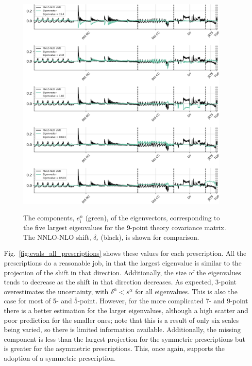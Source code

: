 \begin{figure}[H]
  \begin{center}
    \includegraphics[width=0.95\textwidth]{mhous/plots/eigenvector_plot_10.pdf}\\
    \caption{\small The components,  $e^\alpha_i$ (green), of the eigenvectors, corresponding
      to the five largest eigenvalues for the 9-point theory covariance matrix. The NNLO-NLO shift, $\delta_i$ (black), is shown for comparison.
    \label{fig:evecs1} }
  \end{center}
\end{figure}
Fig.~\ref{fig:evals_all_prescriptions} shows these values for each prescription. All the prescriptions do a reasonable job, in that the largest eigenvalue is similar to the projection of the shift in that direction. Additionally, the size of the eigenvalues tends to decrease as the shift in that direction decreases. As expected, 3-point overestimates the uncertainty, with $\delta^\alpha < s^\alpha$ for all eigenvalues. This is also the case for most of 5- and $\overline{5}$-point. However, for the more complicated 7- and 9-point there is a better estimation for the larger eigenvalues, although a high scatter and poor prediction for the smaller ones; note that this is a result of only six scales being varied, so there is limited information available. Additionally, the missing component is less than the largest projection for the symmetric prescriptions but is greater for the asymmetric prescriptions. This, once again, supports the adoption of a symmetric prescription.

